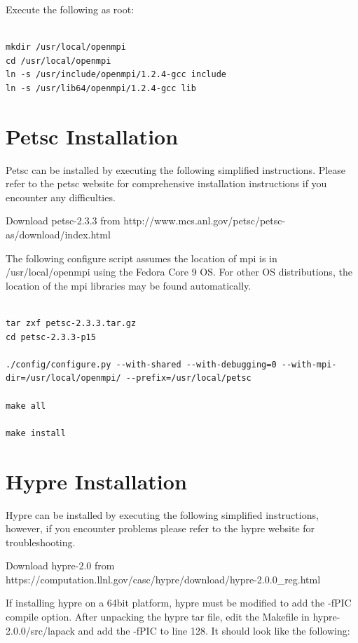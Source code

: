 \documentclass[12pt]{article}
\begin{document}
Execute the following as root:

\begin{Verbatim}

mkdir /usr/local/openmpi
cd /usr/local/openmpi
ln -s /usr/include/openmpi/1.2.4-gcc include
ln -s /usr/lib64/openmpi/1.2.4-gcc lib

\end{Verbatim}



\section{Petsc Installation}

Petsc can be installed by executing the following simplified
instructions.  Please refer to the petsc website for comprehensive
installation instructions if you encounter any difficulties.

Download petsc-2.3.3 from
http://www.mcs.anl.gov/petsc/petsc-as/download/index.html

The following configure script assumes the location of mpi is in
/usr/local/openmpi using the Fedora Core 9 OS.  For other OS
distributions, the location of the mpi libraries may be found
automatically.

\begin{Verbatim}
  
tar zxf petsc-2.3.3.tar.gz
cd petsc-2.3.3-p15

./config/configure.py --with-shared --with-debugging=0 --with-mpi-dir=/usr/local/openmpi/ --prefix=/usr/local/petsc

make all

make install

\end{Verbatim}

\section{Hypre Installation}

Hypre can be installed by executing the following simplified
instructions, however, if you encounter problems please refer to the
hypre website for troubleshooting.

Download hypre-2.0 from
https://computation.llnl.gov/casc/hypre/download/hypre-2.0.0\_reg.html

If installing hypre on a 64bit platform, hypre must be modified to add
the -fPIC compile option.  After unpacking the hypre tar file, edit
the Makefile in hypre-2.0.0/src/lapack and add the -fPIC to line 128.
It should look like the following:
\end{document}

